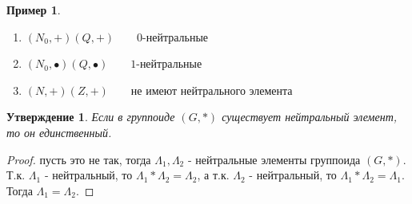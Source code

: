 \documentclass[12pt,oneside]{article}
\newtheorem{iwantthat}[theorem]{Утверждение}
\theoremstyle{definition}
\newtheorem{example}[theorem]{Пример}
\begin{document}
\begin{example}
	\begin{enumerate}[\\]
		\item $(N_0,+)(Q,+) \qquad 0$-нейтральные\\
		\item $(N_0,\bullet)(Q,\bullet) \qquad 1$-нейтральные\\
		\item $(N,+)(Z,+) \qquad $не имеют нейтрального элемента\\
	\end{enumerate}
\end{example}

\begin{iwantthat}
	Если в группоиде $(G,*)$ существует нейтральный элемент, то он единственный.
\end{iwantthat}
\begin{proof}
	пусть это не так, тогда $\Lambda_1, \Lambda_2$ - нейтральные элементы группоида $(G,*)$. Т.к. $\Lambda_1$ - нейтральный, то $\Lambda_1*\Lambda_2=\Lambda_2$, а т.к. $\Lambda_2$ - нейтральный, то $\Lambda_1*\Lambda_2=\Lambda_1$.\\
	Тогда $\Lambda_1=\Lambda_2$.
\end{proof}
\end{document}
